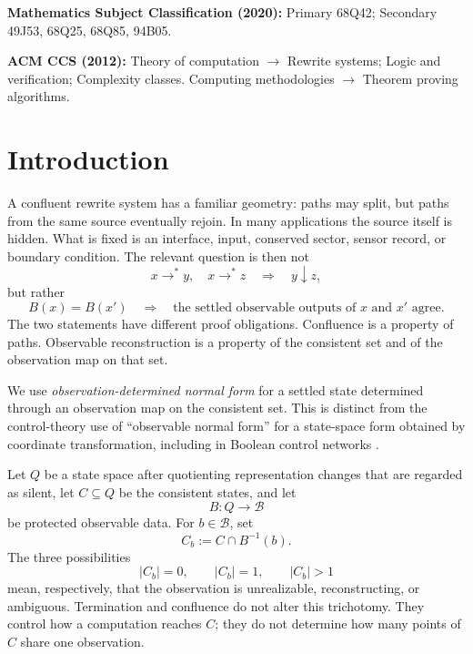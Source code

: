 \documentclass[11pt]{article}
\theoremstyle{definition}
\theoremstyle{remark}
\numberwithin{equation}{section}
\newcommand{\cB}{\mathcal B}
\begin{document}
\noindent\textbf{Mathematics Subject Classification (2020):} Primary 68Q42; Secondary 49J53, 68Q25, 68Q85, 94B05.

\noindent\textbf{ACM CCS (2012):} Theory of computation $\rightarrow$ Rewrite systems; Logic and verification; Complexity classes. Computing methodologies $\rightarrow$ Theorem proving algorithms.

\section{Introduction}\label{sec:intro}

A confluent rewrite system has a familiar geometry: paths may split, but paths from the same source eventually rejoin.  In many applications the source itself is hidden.  What is fixed is an interface, input, conserved sector, sensor record, or boundary condition.  The relevant question is then not
\[
 x\to^*y,\quad x\to^*z\quad\Longrightarrow\quad y\downarrow z,
\]
but rather
\[
 B(x)=B(x')\quad\Longrightarrow\quad
 \text{the settled observable outputs of }x\text{ and }x'\text{ agree}.
\]
The two statements have different proof obligations.  Confluence is a property of paths.  Observable reconstruction is a property of the consistent set and of the observation map on that set.

We use \emph{observation-determined normal form} for a settled state determined
through an observation map on the consistent set.  This is distinct from the
control-theory use of \enquote{observable normal form} for a state-space form
obtained by coordinate transformation, including in Boolean control networks
\citep{ChengLiQi2010}.

Let $Q$ be a state space after quotienting representation changes that are regarded as silent, let $C\subseteq Q$ be the consistent states, and let
\[
 B:Q\longrightarrow\cB
\]
be protected observable data.  For $b\in\cB$, set
\[
 C_b:=C\cap B^{-1}(b).
\]
The three possibilities
\[
 |C_b|=0,\qquad |C_b|=1,\qquad |C_b|>1
\]
mean, respectively, that the observation is unrealizable, reconstructing, or ambiguous.  Termination and confluence do not alter this trichotomy.  They control how a computation reaches $C$; they do not determine how many points of $C$ share one observation.
\end{document}
